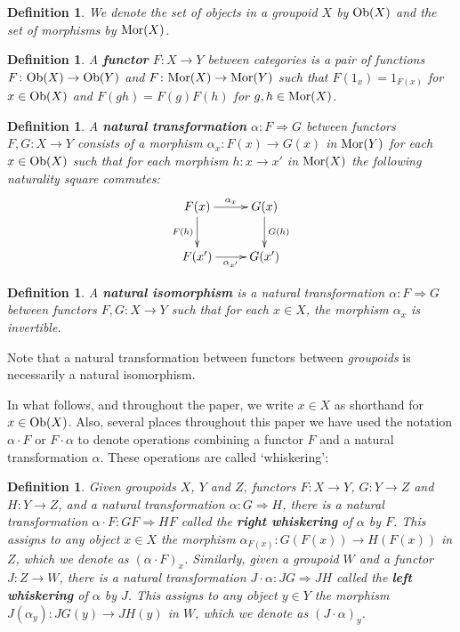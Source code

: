 \documentclass{article}
\newcommand{\To}{\Rightarrow}
\renewcommand{\to}{\rightarrow}
\newcommand{\maps}{\colon}
\newcommand{\Ob}{{\rm Ob}}
\newcommand{\Mor}{{\rm Mor}}
\newtheorem{definition}[thm]{Definition}
\begin{document}
\begin{definition}
We denote the set of objects in a groupoid $X$ by $\Ob(X)$ and the
set of morphisms by $\Mor(X)$.
\end{definition}

\begin{definition}
A {\bf functor} $F \maps X \to Y$ between categories is a pair of
functions $F \maps \Ob(X) \to \Ob(Y)$ and $F \maps \Mor(X) \to
\Mor(Y)$ such that $F(1_x) = 1_{F(x)}$ for $x\in \Ob(X)$ and $F(gh) =
F(g)F(h)$ for $g,h\in \Mor(X)$.
\end{definition}

\begin{definition}
A {\bf natural transformation} $\alpha \maps F \To G$ between 
functors $F,G \maps X \to Y$ consists of a morphism $\alpha_x \maps F(x)
\to G(x)$ in $\Mor(Y)$ for each $x\in \Ob(X)$ such that for each
morphism $h\maps x \to x'$ in $\Mor(X)$ the following naturality
square commutes:
\[
\xymatrix{
F(x) \ar[r]^{\alpha_x} \ar[d]_{F(h)} & G(x) \ar[d]^{G(h)} \\
F(x') \ar[r]_{\alpha_{x'}} & G(x')
}
\]
\end{definition}

\begin{definition}
A {\bf natural isomorphism} is a natural transformation $\alpha \maps
F \To G$ between functors $F,G \maps X \to Y$ such that for each $x
\in X$, the morphism $\alpha_x$ is invertible.
\end{definition}
\noindent
Note that a natural transformation between functors between
{\it groupoids} is necessarily a natural isomorphism.  

In what follows, and throughout the paper, we write $x \in X$ as
shorthand for $x \in \Ob(X)$.  Also, several places throughout this
paper we have used the notation $\alpha\cdot F$ or $F\cdot\alpha$ to
denote operations combining a functor $F$ and a natural transformation
$\alpha$.  These operations are called `whiskering':

\begin{definition}
\label{whiskering}
Given groupoids $X$, $Y$ and $Z$, functors $F\maps X\to Y$, $G\maps
Y\to Z$ and $H\maps Y\to Z$, and a natural transformation $\alpha\maps
G \To H$, there is a natural transformation $\alpha\cdot F\maps
GF \To HF$ called the {\bf right whiskering} of $\alpha$ by
$F$.  This assigns to any object $x \in X$ the morphism
$\alpha_{F(x)}\maps G(F(x)) \to H(F(x))$ in $Z$, which we denote as
$(\alpha\cdot F)_{x}$.  Similarly, given a groupoid $W$ and a functor 
$J \maps Z \to W$, there is a natural transformation $J\cdot \alpha\maps
JG \To JH$ called the {\bf left whiskering} of $\alpha$ by $J$.  This 
assigns to any object $y \in Y$ the morphism $J(\alpha_y)\maps JG(y) 
\to JH(y)$ in $W$, which we denote as $(J\cdot\alpha)_{y}$.
\end{definition}
\end{document}
